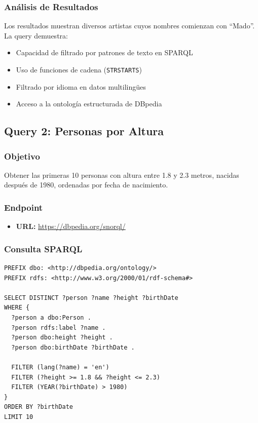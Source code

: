 \documentclass[12pt,a4paper]{article}
\begin{document}
\subsubsection{Análisis de Resultados}

Los resultados muestran diversos artistas cuyos nombres comienzan con ``Mado''. La query demuestra:
\begin{itemize}
    \item Capacidad de filtrado por patrones de texto en SPARQL
    \item Uso de funciones de cadena (\texttt{STRSTARTS})
    \item Filtrado por idioma en datos multilingües
    \item Acceso a la ontología estructurada de DBpedia
\end{itemize}

\subsection{Query 2: Personas por Altura}

\subsubsection{Objetivo}

Obtener las primeras 10 personas con altura entre 1.8 y 2.3 metros, nacidas después de 1980, ordenadas por fecha de nacimiento.

\subsubsection{Endpoint}

\begin{itemize}
    \item \textbf{URL:} \url{https://dbpedia.org/snorql/}
\end{itemize}

\subsubsection{Consulta SPARQL}

\begin{lstlisting}[language=SPARQL, caption={Query 2: Personas por altura y fecha de nacimiento}]
PREFIX dbo: <http://dbpedia.org/ontology/>
PREFIX rdfs: <http://www.w3.org/2000/01/rdf-schema#>

SELECT DISTINCT ?person ?name ?height ?birthDate
WHERE {
  ?person a dbo:Person .
  ?person rdfs:label ?name .
  ?person dbo:height ?height .
  ?person dbo:birthDate ?birthDate .
  
  FILTER (lang(?name) = 'en')
  FILTER (?height >= 1.8 && ?height <= 2.3)
  FILTER (YEAR(?birthDate) > 1980)
}
ORDER BY ?birthDate
LIMIT 10
\end{lstlisting}
\end{document}
